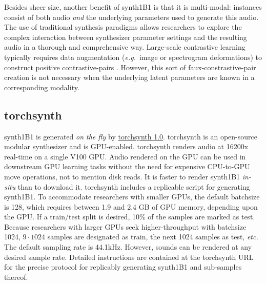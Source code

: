 Besides sheer size, another benefit of synth1B1 is that it is multi-modal: instances consist of both audio {\em and} the underlying parameters used to generate this audio. The use of traditional synthesis paradigms allows researchers to explore the complex interaction between synthesizer parameter settings and the resulting audio in a thorough and comprehensive way. 
Large-scale contrastive learning typically requires data augmentation ({\em e.g.}\ image or spectrogram deformations) to construct positive contrastive-pairs \cite{pmlr-v119-chen20j,DBLP:journals/corr/abs-2103-06695}. However, this sort of faux-constrastive-pair creation is not necessary when the underlying latent parameters are known in a corresponding modality.

\subsection{torchsynth}
\label{section:torchsynth}

synth1B1 is generated {\em on the fly} by \href{https://github.com/torchsynth/torchsynth}{torchsynth 1.0}.
torchsynth is an open-source modular synthesizer and is GPU-enabled. torchsynth renders audio at 16200x real-time on a single V100 GPU. Audio rendered on the GPU can be used in downstream GPU learning tasks without the need for expensive CPU-to-GPU move operations, not to mention disk reads. It is faster to render synth1B1 {\em in-situ} than to download it. torchsynth includes a replicable script for generating synth1B1.
To accommodate researchers with smaller GPUs, the default batchsize is 128, which requires between 1.9 and 2.4 GB of GPU memory, depending upon the GPU.
If a train/test split is desired, 10\% of the samples are marked as test. Because researchers with larger GPUs seek higher-throughput with batchsize 1024, $9 \cdot 1024$ samples are designated as train, the next 1024 samples as test, {\em etc.} The default sampling rate is 44.1kHz. However, sounds can be rendered at any desired sample rate. %
Detailed instructions are contained at the torchsynth URL for the precise protocol for replicably generating synth1B1 and sub-samples thereof. %

